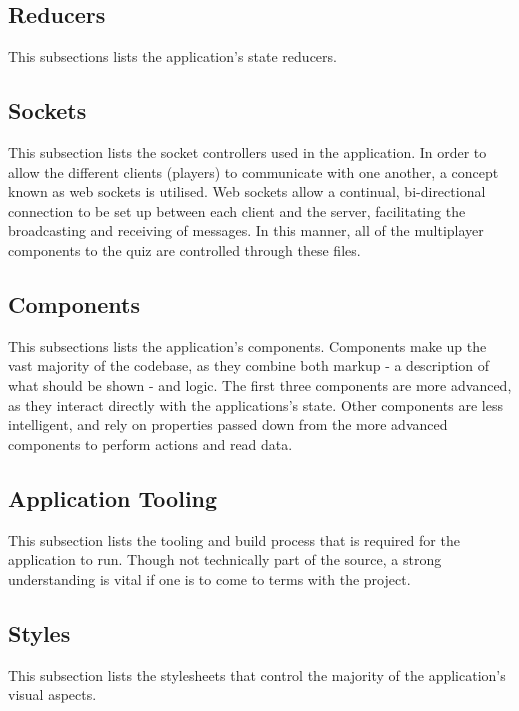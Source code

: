 \subsection{Reducers} %
\label{sub:reducers}
This subsections lists the application's state reducers.


\subsection{Sockets} %
\label{sub:sockets}
This subsection lists the socket controllers used in the application. In order to allow the different clients (players) to communicate with one another, a concept known as web sockets is utilised. Web sockets allow a continual, bi-directional connection to be set up between each client and the server, facilitating the broadcasting and receiving of messages. In this manner, all of the multiplayer components to the quiz are controlled through these files.


\subsection{Components} %
\label{sub:reducers}
This subsections lists the application's components. Components make up the vast majority of the codebase, as they combine both markup - a description of what should be shown - and logic. The first three components are more advanced, as they interact directly with the applications's state. Other components are less intelligent, and rely on properties passed down from the more advanced components to perform actions and read data.


\subsection{Application Tooling} %
\label{sub:api_models}
This subsection lists the tooling and build process that is required for the application to run. Though not technically part of the source, a strong understanding is vital if one is to come to terms with the project.


\subsection{Styles} %
\label{sub:styles}
This subsection lists the stylesheets that control the majority of the application's visual aspects.

